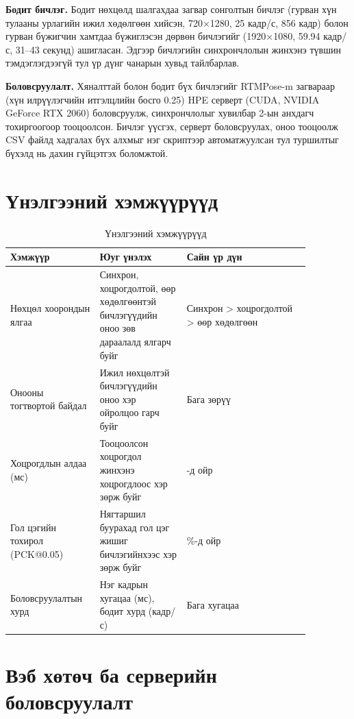 \textbf{Бодит бичлэг.} Бодит нөхцөлд шалгахдаа загвар сонголтын бичлэг (гурван хүн тулааны урлагийн ижил хөдөлгөөн хийсэн, 720×1280, 25 кадр/с, 856 кадр) болон гурван бүжигчин хамтдаа бүжиглэсэн дөрвөн бичлэгийг (1920×1080, 59.94 кадр/с, 31--43 секунд) ашигласан. Эдгээр бичлэгийн синхрончлолын жинхэнэ түвшин тэмдэглэгдээгүй тул үр дүнг чанарын хувьд тайлбарлав.

\textbf{Боловсруулалт.} Хяналттай болон бодит бүх бичлэгийг RTMPose-m загвараар (хүн илрүүлэгчийн итгэлцлийн босго 0.25) HPE серверт (CUDA, NVIDIA GeForce RTX 2060) боловсруулж, синхрончлолыг хувилбар 2-ын анхдагч тохиргоогоор тооцоолсон. Бичлэг үүсгэх, серверт боловсруулах, оноо тооцоолж CSV файлд хадгалах бүх алхмыг нэг скриптээр автоматжуулсан тул туршилтыг бүхэлд нь дахин гүйцэтгэх боломжтой.

\section{Үнэлгээний хэмжүүрүүд}

\begin{table}[H]
\centering
\caption{Үнэлгээний хэмжүүрүүд}
\label{tab:metrics}
\small
\begin{tabular}{|>{\raggedright\arraybackslash}p{0.234\linewidth}|>{\raggedright\arraybackslash}p{0.260\linewidth}|>{\raggedright\arraybackslash}p{0.372\linewidth}|}
\hline
\textbf{Хэмжүүр} & \textbf{Юуг үнэлэх} & \textbf{Сайн үр дүн} \\ \hline
Нөхцөл хоорондын ялгаа & Синхрон, хоцрогдолтой, өөр хөдөлгөөнтэй бичлэгүүдийн оноо зөв дараалалд ялгарч буйг & Синхрон \textgreater{} хоцрогдолтой \textgreater{} өөр хөдөлгөөн \\ \hline
Онооны тогтвортой байдал & Ижил нөхцөлтэй бичлэгүүдийн оноо хэр ойролцоо гарч буйг & Бага зөрүү \\ \hline
Хоцрогдлын алдаа (мс) & Тооцоолсон хоцрогдол жинхэнэ хоцрогдлоос хэр зөрж буйг & 0-д ойр \\ \hline
Гол цэгийн тохирол (PCK@0.05) & Нягтаршил буурахад гол цэг жишиг бичлэгийнхээс хэр зөрж буйг & 100\%-д ойр \\ \hline
Боловсруулалтын хурд & Нэг кадрын хугацаа (мс), бодит хурд (кадр/с) & Бага хугацаа \\ \hline
\end{tabular}
\end{table}

\section{Вэб хөтөч ба серверийн боловсруулалт}

